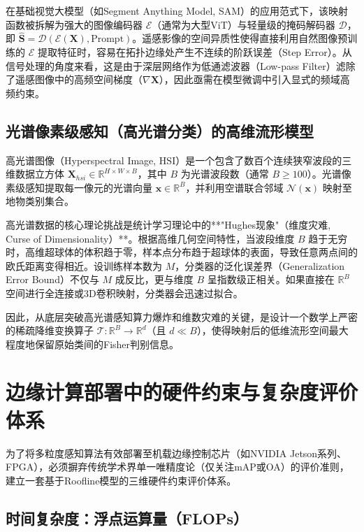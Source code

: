 在基础视觉大模型（如Segment Anything Model, SAM）的应用范式下，该映射函数被拆解为强大的图像编码器 $\mathcal{E}$（通常为大型ViT）与轻量级的掩码解码器 $\mathcal{D}$，即 $\hat{\mathbf{S}} = \mathcal{D}(\mathcal{E}(\mathbf{X}), \text{Prompt})$。遥感影像的空间异质性使得直接利用自然图像预训练的 $\mathcal{E}$ 提取特征时，容易在拓扑边缘处产生不连续的阶跃误差（Step Error）。从信号处理的角度来看，这是由于深层网络作为低通滤波器（Low-pass Filter）滤除了遥感图像中的高频空间梯度（$\nabla \mathbf{X}$），因此亟需在模型微调中引入显式的频域高频约束。

\subsection{光谱像素级感知（高光谱分类）的高维流形模型}

高光谱图像（Hyperspectral Image, HSI）是一个包含了数百个连续狭窄波段的三维数据立方体 $\mathbf{X}_{hsi} \in \mathbb{R}^{H \times W \times B}$，其中 $B$ 为光谱波段数（通常 $B \ge 100$）。光谱像素级感知提取每一像元的光谱向量 $\mathbf{x} \in \mathbb{R}^B$，并利用空谱联合邻域 $\mathcal{N}(\mathbf{x})$ 映射至地物类别集合。

高光谱数据的核心理论挑战是统计学习理论中的**"Hughes现象"（维度灾难, Curse of Dimensionality）**。根据高维几何空间特性，当波段维度 $B$ 趋于无穷时，高维超球体的体积趋于零，样本点分布趋于超球体的表面，导致任意两点间的欧氏距离变得相近。设训练样本数为 $M$，分类器的泛化误差界（Generalization Error Bound）不仅与 $M$ 成反比，更与维度 $B$ 呈指数级正相关。如果直接在 $\mathbb{R}^B$ 空间进行全连接或3D卷积映射，分类器会迅速过拟合。

因此，从底层突破高光谱感知算力爆炸和维数灾难的关键，是设计一个数学上严密的稀疏降维变换算子 $\mathcal{T}: \mathbb{R}^B \to \mathbb{R}^d$（且 $d \ll B$），使得映射后的低维流形空间最大程度地保留原始类间的Fisher判别信息。

\section{边缘计算部署中的硬件约束与复杂度评价体系}

为了将多粒度感知算法有效部署至机载边缘控制芯片（如NVIDIA Jetson系列、FPGA），必须摒弃传统学术界单一唯精度论（仅关注mAP或OA）的评价准则，建立一套基于Roofline模型的三维硬件约束评价体系。

\subsection{时间复杂度：浮点运算量（FLOPs）}

